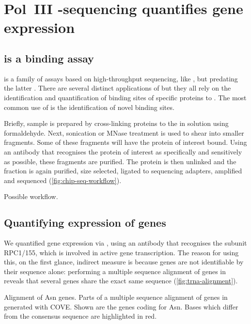 \chapter{Pol~III -sequencing quantifies  gene
expression}
\label{sec:chip}

\section{ is a  binding assay}

\chipseq is a family of assays based on high-throughput sequencing, like
\rnaseq, but predating the latter \citet{Johnson:2007}. There are several
distinct applications of \chipseq but they all rely on the identification and
quantification of binding sites of specific proteins to \dna. The most common
use of \chipseq is the identification of novel \tf binding
sites.

Briefly, sample is prepared by cross-linking proteins to the \dna in solution
using formaldehyde. Next, sonication or MNase treatment is used to shear \dna
into smaller fragments. Some of these fragments will have the protein of
interest bound. Using an antibody that recognises the protein of interest as
specifically and sensitively as possible, these fragments are purified. The
protein is then unlinked and the \dna fraction is again purified, size selected,
ligated to sequencing adapters, amplified and sequenced
(\cref{fig:chip-seq-workflow}).\todo[ref]{}

    {Possible \chipseq workflow.}
    {}

\section{Quantifying expression of  genes}

We quantified \trna gene expression via  \chipseq, using an antibody that
recognises the  subunit RPC1/155, which is involved in active \trna gene
transcription. The reason for using this, on the first glance, indirect measure
is because \trna genes are not identifiable by their sequence alone: performing
a multiple sequence alignment of \trna genes in \mmu reveals that several \trna
genes share the exact same sequence (\cref{fig:trna-alignment}).

    {\footnotesize
    }
    {Alignment of Asn \trna genes.}
    {Parts of a multiple sequence alignment of \trna genes in \mmu generated
    with COVE\@. Shown are the \trna genes coding for Asn. Bases which differ
    from the consensus sequence are highlighted in red.}

